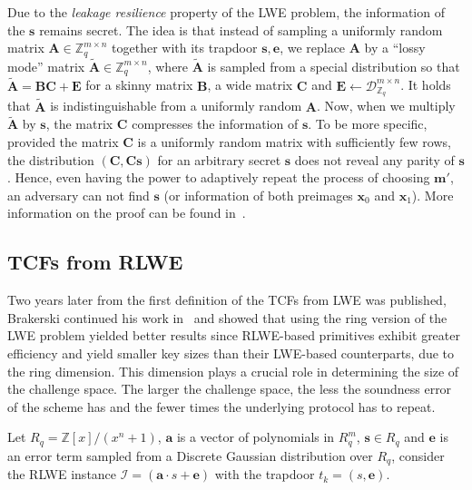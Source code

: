 \documentclass[cryptography,review,submit,pdftex,moreauthors,amsmath,amssymb,aps,strict]{Definitions/mdpi}
\begin{document}
Due to the \textit{leakage resilience} property of the LWE problem, the information of the $\mathbf{s}$ remains secret. The idea is that instead of sampling a uniformly random matrix $\mathbf{A}\in\mathbb{Z}^{m\times n}_q$ together with its trapdoor $\mathbf{s},\mathbf{e}$, we replace $\mathbf{A}$ by a ``lossy mode'' matrix $\tilde{\mathbf{A}}\in\mathbb{Z}^{m\times n}_q$, where $\tilde{\mathbf{A}}$ is sampled from a special distribution so that $\tilde{\mathbf{A}}=\mathbf{B}\mathbf{C}+\mathbf{E}$ for a skinny matrix $\mathbf{B}$, a wide matrix $\mathbf{C}$ and $\mathbf{E}\gets\mathcal{D}_{\mathbb{Z}_q}^{m\times n}$. It holds that $\tilde{\mathbf{A}}$ is indistinguishable from a uniformly random $\mathbf{A}$. Now, when we multiply $\tilde{\mathbf{A}}$ by $\mathbf{s}$, the matrix $\mathbf{C}$ compresses the information of $\mathbf{s}$. To be more specific, provided the matrix $\mathbf{C}$ is a uniformly random matrix with sufficiently few rows, the distribution $(\mathbf{C},\mathbf{C}\mathbf{s})$ for an arbitrary secret $\mathbf{s}$ does not reveal any parity of $\mathbf{s}$.
Hence, even having the power to adaptively repeat the process of choosing $\mathbf{m}'$, an adversary can not find $\mathbf{s}$ (or information of both preimages $\mathbf{x}_0$ and $\mathbf{x}_1$).
More information on the proof can be found in~\cite{Brakerski18_Interactiveproofofquantumness}.


\subsection{TCFs from RLWE}
Two years later from the first definition of the TCFs from LWE was published, Brakerski continued his work in~\cite{BrakerskiProofofQuantumness} and showed that using the ring version of the LWE problem yielded better results since RLWE-based primitives exhibit greater efficiency and yield smaller key sizes than their LWE-based counterparts, due to the ring dimension. This dimension plays a crucial role in determining the size of the challenge space. The larger the challenge space, the less the soundness error of the scheme has and the fewer times the underlying protocol has to repeat. 

Let $R_q=\mathbb{Z}[x]/(x^n+1)$, $\mathbf{a}$ is a vector of polynomials in $R_q^m$, $\mathbf{s}\in R_q$ and $\mathbf{e}$ is an error term sampled from a Discrete Gaussian distribution over $R_q$, consider the RLWE instance $\mathcal{I}=(\mathbf{a}\cdot s +\mathbf{e})$ with the trapdoor $t_k=(s,\mathbf{e})$.
\end{document}
